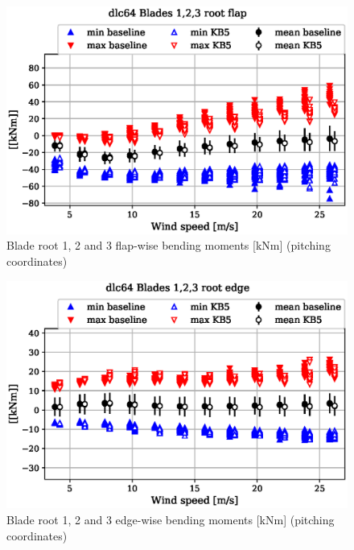 \begin{figure}[!ht]
\begin{center}
	\includegraphics[width=.85\linewidth]{figures/baseline-vs-KB6/dlc64/blade1-blade1-node-001-momentvec-x_AA0007_AA0003.eps}
\end{center}
\caption{Blade root 1, 2 and 3 flap-wise bending moments [kNm] (pitching coordinates)}
\label{fig:baseline-vs-KB6:dlc64:blade-root-flap}
\end{figure}

\begin{figure}[!ht]
\begin{center}
	\includegraphics[width=.85\linewidth]{figures/baseline-vs-KB6/dlc64/blade1-blade1-node-001-momentvec-y_AA0007_AA0003.eps}
\end{center}
\caption{Blade root 1, 2 and 3 edge-wise bending moments [kNm] (pitching coordinates)}
\label{fig:baseline-vs-KB6:dlc64:blade-root-edge}
\end{figure}

